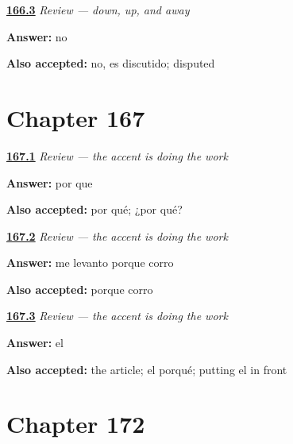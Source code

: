 \noindent\begin{minipage}[t]{\linewidth}
\raggedright
\hyperlink{review-ES-C37-repaso-sentado-de-pie-andando-origen}{\textbf{166.3}} \emph{Review — down, up, and away}\par
\small \textbf{Answer:} no\par
\footnotesize \textbf{Also accepted:} no, es discutido; disputed
\end{minipage}\par\medskip

\section*{Chapter 167}

\noindent\begin{minipage}[t]{\linewidth}
\raggedright
\hyperlink{review-ES-C38-repaso-los-tres-porques-ask}{\textbf{167.1}} \emph{Review — the accent is doing the work}\par
\small \textbf{Answer:} por que\par
\footnotesize \textbf{Also accepted:} por qué; ¿por qué?
\end{minipage}\par\medskip

\noindent\begin{minipage}[t]{\linewidth}
\raggedright
\hyperlink{review-ES-C38-repaso-los-tres-porques-give}{\textbf{167.2}} \emph{Review — the accent is doing the work}\par
\small \textbf{Answer:} me levanto porque corro\par
\footnotesize \textbf{Also accepted:} porque corro
\end{minipage}\par\medskip

\noindent\begin{minipage}[t]{\linewidth}
\raggedright
\hyperlink{review-ES-C38-repaso-los-tres-porques-noun}{\textbf{167.3}} \emph{Review — the accent is doing the work}\par
\small \textbf{Answer:} el\par
\footnotesize \textbf{Also accepted:} the article; el porqué; putting el in front
\end{minipage}\par\medskip

\section*{Chapter 172}

